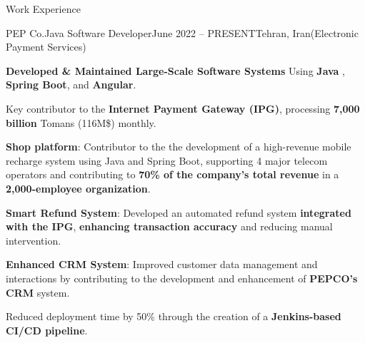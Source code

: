 \documentclass[]{kyvernitis-resume}
\begin{document}
\begin{section}{Work Experience}
    \begin{subsection}{PEP Co.}{Java Software Developer}{June 2022 -- PRESENT}{Tehran, Iran}{(Electronic Payment Services)}

		\item \textbf{Developed \& Maintained Large-Scale Software Systems} Using \textbf{Java} , \textbf{Spring Boot}, and \textbf{Angular}.

		\item Key contributor to the \textbf{Internet Payment Gateway (IPG)}, processing \textbf{7,000 billion} Tomans (116M\$) monthly.
		
		\item \textbf{Shop platform}: Contributor to the the development of a high-revenue mobile recharge system using Java and Spring Boot, supporting 4 major telecom operators and contributing to \textbf{70\% of the company’s total revenue} in a \textbf{2,000-employee organization}.
		\item \textbf{Smart Refund System}: Developed an automated refund system \textbf{integrated with the IPG}, \textbf{enhancing transaction accuracy} and reducing manual intervention.

		\item \textbf{Enhanced CRM System}: Improved customer data management and interactions by contributing to the development and enhancement of \textbf{PEPCO's CRM} system.
			
		\item Reduced deployment time by 50\% through the creation of a \textbf{Jenkins-based CI/CD pipeline}.

		

\end{subsection}
\end{section}
\end{document}

